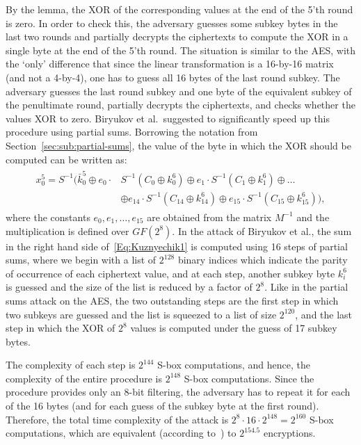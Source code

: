 By the lemma, the XOR of the corresponding values at the end of the 5'th round is zero. In order to check this, the adversary guesses some subkey bytes in the last two rounds and partially decrypts the ciphertexts to compute the XOR in a single byte at the end of the 5'th round. The situation is similar to the AES, with the `only' difference that since the linear transformation is a 16-by-16 matrix (and not a 4-by-4), one has to guess all 16 bytes of the last round subkey. The adversary guesses the last round subkey and one byte of the equivalent subkey of the penultimate round, partially decrypts the ciphertexts, and checks whether the values XOR to zero. Biryukov et al.~suggested to significantly speed up this procedure using partial sums. Borrowing the notation from Section~\ref{sec:sub:partial-sums}, the value of the byte in which the XOR should be computed can be written as: 
\begin{align}\label{Eq:Kuznyechik1}
  \begin{split}
x^5_0=S^{-1}(\bar{k}^5_0 \oplus e_0 \cdot &S^{-1}(C_0 \oplus k^6_0) \oplus e_1 \cdot S^{-1}(C_1 \oplus k^6_1) \oplus \ldots \\
&\oplus e_{14} \cdot S^{-1}(C_{14} \oplus k^6_{14}) \oplus e_{15} \cdot S^{-1}(C_{15} \oplus k^6_{15})),
  \end{split}  
\end{align}
where the constants $e_0,e_1,\ldots,e_{15}$ are obtained from the matrix $M^{-1}$ and the multiplication is defined over $GF(2^8)$. In the attack of Biryukov et al., the sum in the right hand side of~\eqref{Eq:Kuznyechik1} is computed using 16 steps of partial sums, where we begin with a list of $2^{128}$ binary indices which indicate the parity of occurrence of each ciphertext value, and at each step, another subkey byte $k^6_i$ is guessed and the size of the list is reduced by a factor of $2^8$. Like in the partial sums attack on the AES, the two outstanding steps are the first step in which two subkeys are guessed and the list is squeezed to a list of size $2^{120}$, and the last step in which the XOR of $2^8$ values is computed under the guess of 17 subkey bytes. 

The complexity of each step is $2^{144}$ S-box computations, and hence, the complexity of the entire procedure is $2^{148}$ S-box computations. Since the procedure provides only an 8-bit filtering, the adversary has to repeat it for each of the 16 bytes (and for each guess of the subkey byte at the first round). Therefore, the total time complexity of the attack is $2^{8} \cdot 16 \cdot 2^{148}=2^{160}$ S-box computations, which are equivalent (according to~\cite{TOSC:BirKhoPer16}) to $2^{154.5}$ encryptions.


